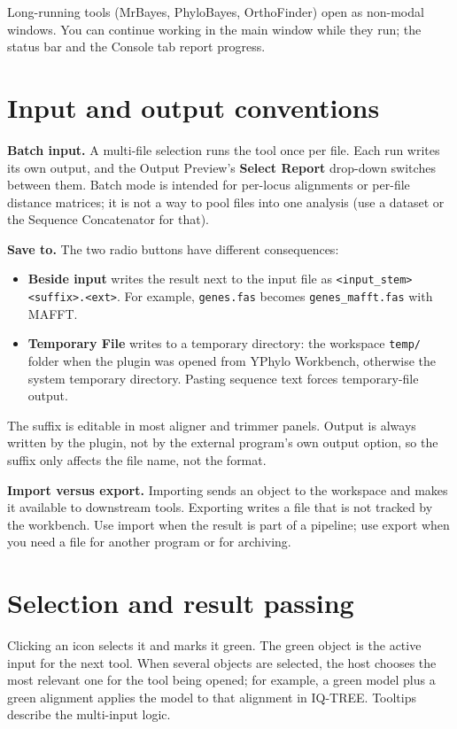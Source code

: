 \documentclass[10pt]{report}
\begin{document}
Long-running tools (MrBayes, PhyloBayes, OrthoFinder) open as non-modal
windows. You can continue working in the main window while they run; the
status bar and the Console tab report progress.

\section{Input and output conventions}

\textbf{Batch input.} A multi-file selection runs the tool once per file. Each
run writes its own output, and the Output Preview's \textbf{Select Report}
drop-down switches between them. Batch mode is intended for per-locus
alignments or per-file distance matrices; it is not a way to pool files into
one analysis (use a dataset or the Sequence Concatenator for that).

\textbf{Save to.} The two radio buttons have different consequences:

\begin{itemize}
  \item \textbf{Beside input} writes the result next to the input file as
        \texttt{<input\_stem><suffix>.<ext>}. For example,
        \texttt{genes.fas} becomes \texttt{genes\_mafft.fas} with MAFFT.
  \item \textbf{Temporary File} writes to a temporary directory: the workspace
        \texttt{temp/} folder when the plugin was opened from YPhylo
        Workbench, otherwise the system temporary directory. Pasting sequence
        text forces temporary-file output.
\end{itemize}

The suffix is editable in most aligner and trimmer panels. Output is always
written by the plugin, not by the external program's own output option, so the
suffix only affects the file name, not the format.

\textbf{Import versus export.} Importing sends an object to the workspace and
makes it available to downstream tools. Exporting writes a file that is not
tracked by the workbench. Use import when the result is part of a pipeline;
use export when you need a file for another program or for archiving.

\section{Selection and result passing}

Clicking an icon selects it and marks it green. The green object is the active
input for the next tool. When several objects are selected, the host chooses
the most relevant one for the tool being opened; for example, a green model
plus a green alignment applies the model to that alignment in IQ-TREE. Tooltips
describe the multi-input logic.
\end{document}
